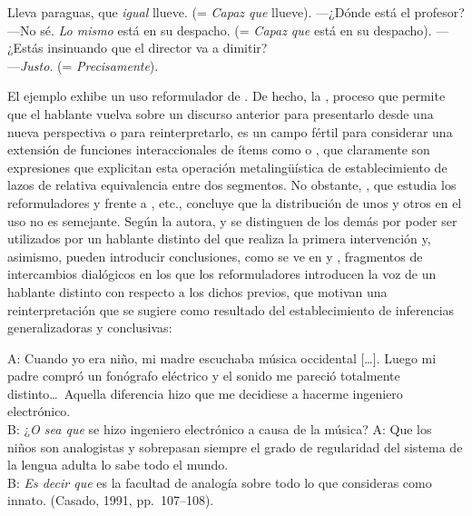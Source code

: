 \begin{exe}
  \ex\label{ex:14-igual} Lleva paraguas, que \textit{igual} llueve. (= \textit{Capaz
      que} llueve).
  \ex\label{ex:14-lomismo} ---¿Dónde está el profesor?\\
      ---No sé. \textit{Lo mismo} está en su despacho. (= \textit{Capaz que} está
      en su despacho).
  \ex\label{ex:14-justo2} ---¿Estás insinuando que el director va a dimitir?\\
      ---\textit{Justo}. (= \textit{Precisamente}).
\end{exe}

El ejemplo  exhibe un uso reformulador de . De
hecho, la , proceso que permite que el hablante vuelva
sobre un discurso anterior para presentarlo desde una nueva perspectiva o para
reinterpretarlo, es un campo fértil para considerar una extensión de funciones
interaccionales de ítems como  o
, que claramente son expresiones que explicitan
esta operación metalingüística de establecimiento de lazos de relativa
equivalencia entre dos segmentos. No obstante, \textcite{rodriguezramalle2014},
que estudia los reformuladores  y  frente a
, etc., concluye que la
distribución de unos y otros en el uso no es semejante. Según la autora,
 y  se distinguen de los demás por poder ser
utilizados por un hablante distinto del que realiza la primera intervención y,
asimismo, pueden introducir conclusiones, como se ve en 
y , fragmentos de intercambios dialógicos en los que los
reformuladores introducen la voz de un hablante distinto con respecto a los
dichos previos, que motivan una reinterpretación que se sugiere como resultado
del establecimiento de inferencias generalizadoras y conclusivas:

\begin{exe}
  \ex\label{ex:14-ingeniero} A: Cuando yo era niño, mi madre escuchaba música
      occidental [\ldots]. Luego mi padre compró un fonógrafo eléctrico y el
      sonido me pareció totalmente distinto\ldots\ Aquella diferencia hizo que me
      decidiese a hacerme ingeniero electrónico.\\
      B: ¿\textit{O sea que} se hizo ingeniero electrónico a causa de la música?
  \ex\label{ex:14-analogia} A: Que los niños son analogistas y sobrepasan siempre
      el grado de regularidad del sistema de la lengua adulta lo sabe todo el
      mundo.\\
      B: \textit{Es decir que} es la facultad de analogía sobre todo lo que
      consideras como innato. (Casado, 1991, pp.~107--108).
\end{exe}

